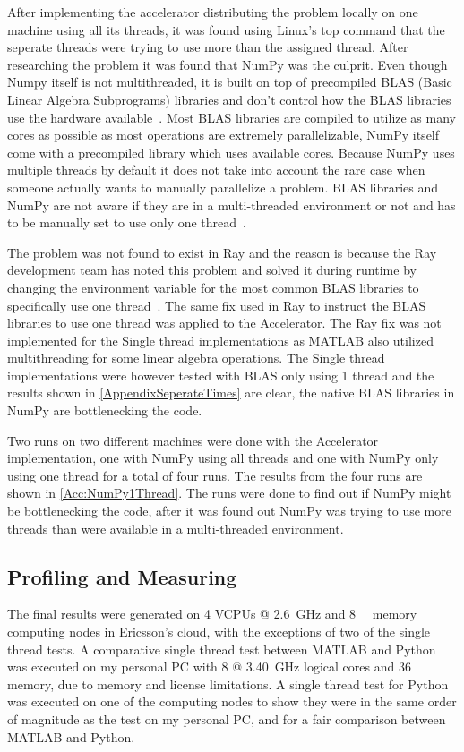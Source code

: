 \documentclass[12pt, a4paper]{article}
\begin{document}
After implementing the accelerator distributing the problem locally on one machine using all its threads, it was found using Linux's top command that the seperate threads were trying to use more than the assigned thread.
After researching the problem it was found that NumPy was the culprit.
Even though Numpy itself is not multithreaded, it is built on top of precompiled BLAS (Basic Linear Algebra Subprograms) libraries and don't control how the BLAS libraries use the hardware available~\cite{Numpy:OpenBLAS}.
Most BLAS libraries are compiled to utilize as many cores as possible as most operations are extremely parallelizable, NumPy itself come with a precompiled library which uses available cores.
Because NumPy uses multiple threads by default it does not take into account the rare case when someone actually wants to manually parallelize a problem. 
BLAS libraries and NumPy are not aware if they are in a multi-threaded environment or not and has to be manually set to use only one thread~\cite{OpenBLAS:threadSafe}.

The problem was not found to exist in Ray and the reason is because the Ray development team has noted this problem and solved it during runtime by changing the environment variable for the most common BLAS libraries to specifically use one thread~\cite{ray:OMPNUMTHREAD}. 
The same fix used in Ray to instruct the BLAS libraries to use one thread was applied to the Accelerator.
The Ray fix was not implemented for the Single thread implementations as MATLAB also utilized multithreading for some linear algebra operations.
The Single thread implementations were however tested with BLAS only using 1 thread and the results shown in \cref{AppendixSeperateTimes} are clear, the native BLAS libraries in NumPy are bottlenecking the code.

Two runs on two different machines were done with the Accelerator implementation, one with NumPy using all threads and one with NumPy only using one thread for a total of four runs.
The results from the four runs are shown in \cref{Acc:NumPy1Thread}.
The runs were done to find out if NumPy might be bottlenecking the code, after it was found out NumPy was trying to use more threads than were available in a multi-threaded environment.

\subsection{Profiling and Measuring}

The final results were generated on 4 VCPUs @ \SI{2.6}{\giga\hertz} and \SI{8}{\giga\byte} memory computing nodes in Ericsson's cloud, with the exceptions of two of the single thread tests.
A comparative single thread test between MATLAB and Python was executed on my personal PC with 8 @ \SI{3.40}{\giga\hertz} logical cores and \SI{36}{\giga\byte} memory, due to memory and license limitations. 
A single thread test for Python was executed on one of the computing nodes to show they were in the same order of magnitude as the test on my personal PC, and for a fair comparison between MATLAB and Python.
\end{document}
